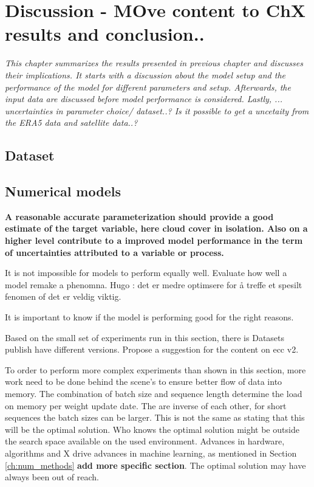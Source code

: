 \chapter{Discussion - MOve content to ChX results and conclusion..}
\textit{This chapter summarizes the results presented in previous chapter and discusses their implications. It starts with a discussion about the model setup and the performance of the model for different parameters and setup. Afterwards, the input data are discussed before model performance is considered. Lastly, ... uncertainties in parameter choice/ dataset..? Is it possible to get a uncetaity from the ERA5 data and satellite data..?} 

\section{Dataset}



\section{Numerical models}
\textbf{A reasonable accurate parameterization should provide a good estimate of the target variable, here cloud cover in isolation. Also on a higher level contribute to a improved model performance in the term of uncertainties attributed to a variable or process.}  

It is not impossible for models to perform equally well. Evaluate how well a model remake a phenomna. Hugo : det er medre optimsere for å treffe et spesilt fenomen of det er veldig viktig. 


It is important to know if the model is performing good for the right reasons.

Based on the small set of experiments run in this section, there is 
Datasets publish have different versions. Propose a suggestion for the content on \acrshort{ecc} v2.

To order to perform more complex experiments than shown in this section, more work need to be done behind the scene's to ensure better flow of data into memory. The combination of batch size and sequence length determine the load on memory per weight update date. The are inverse of each other, for short sequences the batch sizes can be larger. This is not the same as stating that this will be the optimal solution. Who knows the optimal solution might be outside the search space available on the used environment. Advances in hardware, algorithms and X drive advances in machine learning, as mentioned in Section \ref{ch:num_methods} \textbf{add more specific section}. The optimal solution may have always been out of reach. 

